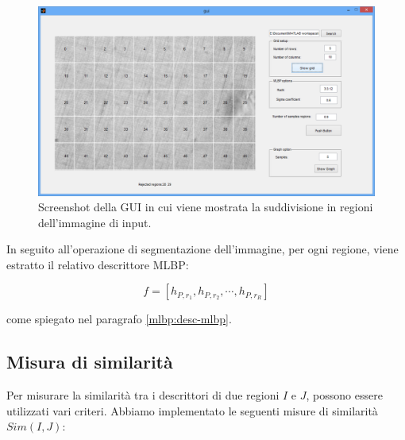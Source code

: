 \begin{figure}[ht]
\begin{center}
\includegraphics[width=.95\textwidth]{img/gui_pre_lbp}
\caption{ Screenshot della GUI in cui viene mostrata la suddivisione in regioni dell'immagine di input.}
\label{fig:GUIpreLBP}
\end{center}
\end{figure}

In seguito all'operazione di segmentazione dell'immagine, per ogni regione, viene estratto il relativo descrittore \acs{MLBP}:

\begin{equation*}
f = [h_{P, r_{1}}, h_{P, r_{2}}, \cdots, h_{P, r_R}]
\end{equation*}


\noindent come spiegato nel paragrafo \ref{mlbp:desc-mlbp}. 



%	
	



\subsection{Misura di similarità}

Per misurare la similarità tra i descrittori di due regioni $I$ e $J$, possono essere utilizzati vari criteri. Abbiamo implementato le seguenti misure di similarità $Sim(I, J)$:


